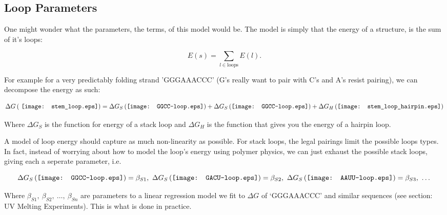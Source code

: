 \subsection{Loop Parameters} 

One might wonder what the parameters, the terms, of this model would
be. The model is simply that the energy of a structure, is the sum of it's loops:

\begin{equation}
E(s) = \sum_{l \in \text{loops}} E(l).
\end{equation}

For example for a very predictably folding strand 'GGGAAACCC' (G's
really want to pair with C's and A's resist pairing), we can decompose
the energy as such:

\begin{equation}
\Delta G \left ( \vcenter{\hbox{ \texttt{[image: stem\_loop.eps]}}}
 \right ) =
\Delta G_S \left ( \vcenter{\hbox{\texttt{[image: GGCC-loop.eps]}}}
\right ) +
\Delta G_S \left ( \vcenter{\hbox{\texttt{[image: GGCC-loop.eps]}}}
\right ) + 
\Delta G_H \left (\vcenter{\hbox{\texttt{[image: stem\_loop\_hairpin.eps]}}}
\right )
\label{eq:decomposition}
\end{equation}

Where $\Delta G_S$ is the function for energy of a stack loop and
$\Delta G_H$ is the function that gives you the energy of a hairpin
loop.

A model of loop energy should capture as much non-linearity as
possible. For stack loops, the legal pairings limit the possible loops
types. In fact, instead of worrying about how to model the loop's
energy using polymer physics, we can just exhaust the possible stack
loops, giving each a seperate parameter, i.e.

\begin{equation}
\Delta G_S \left ( \vcenter{\hbox{\texttt{[image: GGCC-loop.eps]}}}
\right ) = \beta_{S1}, \  
\Delta G_S \left ( \vcenter{\hbox{\texttt{[image: GACU-loop.eps]}}}
\right ) = \beta_{S2}, \ 
\Delta G_S \left ( \vcenter{\hbox{\texttt{[image: AAUU-loop.eps]}}}
\right ) = \beta_{S3}, \ \dots
\end{equation}

Where $\beta_{S1},\  \beta_{S2},\  \dots,\  \beta_{Sn}$ are parameters to a linear
regression model we fit to $\Delta G$ of `GGGAAACCC' and similar
sequences (see section: UV Melting Experiments). This is what is done in practice.

